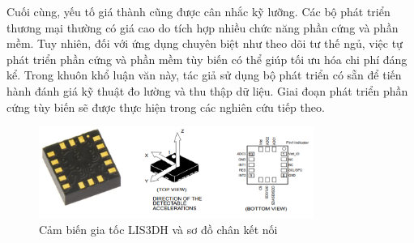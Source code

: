 Cuối cùng, yếu tố giá thành cũng được cân nhắc kỹ lưỡng. Các bộ phát triển thương mại thường có giá cao do tích hợp nhiều chức năng phần cứng và phần mềm. Tuy nhiên, đối với ứng dụng chuyên biệt như theo dõi tư thế ngủ, việc tự phát triển phần cứng và phần mềm tùy biến có thể giúp tối ưu hóa chi phí đáng kể. Trong khuôn khổ luận văn này, tác giả sử dụng bộ phát triển có sẵn để tiến hành đánh giá kỹ thuật đo lường và thu thập dữ liệu. Giai đoạn phát triển phần cứng tùy biến sẽ được thực hiện trong các nghiên cứu tiếp theo.

\begin{figure}[!ht]
		\centering
 		\includegraphics[width=0.8\textwidth]{images/lis.png}
		\caption{Cảm biến gia tốc LIS3DH và sơ đồ chân kết nối}
		\label{lis}
\end{figure}

